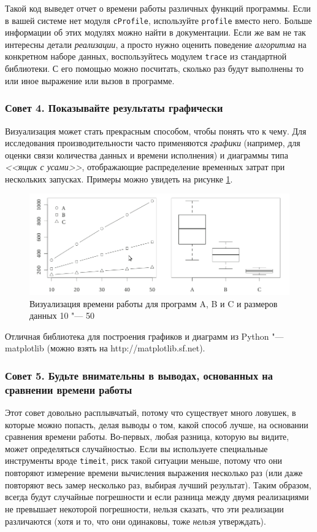 Такой код выведет отчет о времени работы различных функций программы. Если в вашей системе нет модуля \texttt{cProfile}, используйте \texttt{profile} вместо него. Больше информации об этих модулях можно найти в документации. Если же вам не так интересны детали \textit{реализации}, а просто нужно оценить поведение \textit{алгоритма} на конкретном наборе данных, воспользуйтесь модулем \texttt{trace} из стандартной библиотеки. С его помощью можно посчитать, сколько раз будут выполнены то или иное выражение или вызов в программе.

\subsubsection*{Совет 4. Показывайте результаты графически}

Визуализация может стать прекрасным способом, чтобы понять что к чему. Для исследования производительности часто применяются \textit{графики} (например, для оценки связи количества данных и времени исполнения) и диаграммы типа \textit{<<ящик с усами>>}, отображающие распределение временных затрат при нескольких запусках. Примеры можно увидеть на рисунке \ref{fig:evaluation-diagrams}.

\begin{figure}[h]
	\includegraphics[width=\textwidth]{img/2-2.png}
	\caption{Визуализация времени работы для программ A, B и C и размеров данных 10 "--- 50}
	\label{fig:evaluation-diagrams}
\end{figure}

Отличная библиотека для построения графиков и диаграмм из Python "--- matplotlib (можно взять на http://matplotlib.sf.net).

\subsubsection*{Совет 5. Будьте внимательны в выводах, основанных на сравнении времени работы}

Этот совет довольно расплывчатый, потому что существует много ловушек, в которые можно попасть, делая выводы о том, какой способ лучше, на основании сравнения времени работы. Во-первых, любая разница, которую вы видите, может определяться случайностью. Если вы используете специальные инструменты вроде \texttt{timeit}, риск такой ситуации меньше, потому что они повторяют измерение времени вычисления выражения несколько раз (или даже повторяют весь замер несколько раз, выбирая лучший результат). Таким образом, всегда будут случайные погрешности и если разница между двумя реализациями не превышает некоторой погрешности, нельзя сказать, что эти реализации различаются (хотя и то, что они одинаковы, тоже \textit{нельзя} утверждать).

